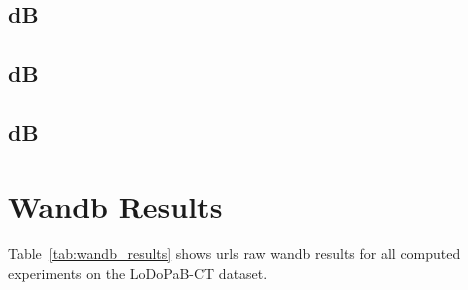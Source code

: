 \clearpage

\subsection{ dB}

\clearpage

\subsection{ dB}

\clearpage
\subsection{ dB}


\section{Wandb Results}
\label{sec:wandb}
Table~\ref{tab:wandb_results} shows urls raw wandb results for all computed experiments on the LoDoPaB-CT dataset.

